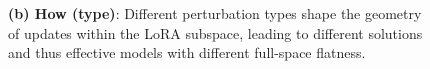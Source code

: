 \documentclass{article}
\theoremstyle{plain}
\theoremstyle{definition}
\theoremstyle{remark}
\begin{document}
{\begin{figure}[htbp]
{    %
    \textbf{(b) How (type)}:
Different perturbation types shape the geometry of updates within the LoRA subspace, leading to different solutions and thus effective models with different full-space flatness.
    }
    \label{fig:scope_type1}
\end{figure}
}
\end{document}
